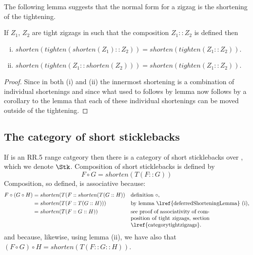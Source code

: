 \begin{aside}
The following lemma suggests that the normal form for a zigzag is the
shortening of the tightening.
\end{aside}
\begin{lemma}
If $Z_1$, $Z_2$ are tight zigzags in
 such that the composition $Z_1 :: Z_2$ is defined then
\begin{enumerate}[(i)]
\item 
$shorten(tighten(shorten(Z_1) :: Z_2))= shorten(tighten(Z_1 :: Z_2)).$
\item
$shorten(tighten(Z_1 :: shorten(Z_2)))= shorten(tighten(Z_1 :: Z_2)).$
\end{enumerate}
\end{lemma}
\begin{proof}
Since in both (i) and (ii) the innermost shortening is a combination 
of individual shortenings and since
what used to follows
 by lemma  now follows by a corollary
 to the lemma  that 
each of these individual shortenings can be moved outside of the tightening.
\end{proof}

\subsection{The category of short sticklebacks}

If \catcw is an RR.5 range catgeory then
 there is a category of short sticklebacks over \catc, which we denote
 $\Stk$.
Composition of short sticklebacks is defined by
\[
F \circ G = shorten(T(F::G)) 
\]
Composition, so defined, is associative because:
\begin{align*}
F \circ (G \circ H)
  &= shorten(T(F :: shorten(T(G ::H)) && \mbox{definition $\circ$,} \\
  &= shorten (T(F::T(G::H))) && \mbox{by lemma \lref{deferredShorteningLemma} (i),} \\
  &= shorten (T(F::G::H))    && \mbox{\parbox[t]{5cm}{see proof of associativity of composition of tight zigzags, section \lref{categorytightzigzags}.}}
\end{align*}  
and because, likewise, 
using lemma  (ii),
we have also that $(F \circ G) \circ H=shorten (T(F::G::H))$.

